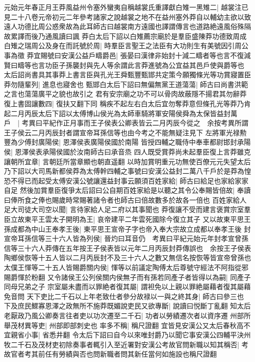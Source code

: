 元始元年春正月王莽風益州令塞外蠻夷自稱越裳氏重譯獻白雉一黑雉二|{
	越裳注已見二十八卷元帝初元二年參考諸家之說越裳之地不在益州塞外莽自以輔幼主欲以致遠人功德比周公惑衆故為此耳師古曰越裳南方遠國也譯謂傳言也道路絶遠風俗殊隔故累譯而後乃通風讀曰諷}
莽白太后下詔以白雉薦宗廟於是羣臣盛陳莽功德致周成白雉之瑞周公及身在而託號於周|{
	時羣臣言聖王之法臣有大功則生有美號因引周公事為徵}
莽宜賜號曰安漢公益戶疇爵邑|{
	張晏曰漢律非始封十減二疇者等也言不復減賢曰疇等也言功臣子孫襲封與先人等余謂此言莽進號為公宜益其邑戶使與爵等也}
太后詔尚書具其事莽上書言臣與孔光王舜甄豐甄邯共定策今願獨條光等功賞寢置臣莽勿隨輩列|{
	進息也寢舍也}
甄邯白太后下詔曰無偏無黨王道蕩蕩|{
	師古曰尚書洪範之言也蕩蕩廣平之貌也故引之}
君有安宗廟之功不可以骨肉故蔽隱不揚君其勿辭莽復上書固讓數四|{
	復扶又翻下同}
稱疾不起左右白太后宜勿奪莽意但條孔光等莽乃肯起二月丙辰太后下詔以太傅博山侯光為太師車騎將軍安陽侯舜為太保皆益封萬戶　|{
	考異曰平紀作正月事而王子侯表公卿表皆云二月丙辰今從之　余按考異所謂王子侯云二月丙辰封者謂宣帝耳孫信等也由今考之不能無疑注見下}
左將軍光禄勲豐為少傅封廣陽侯|{
	恩澤侯表廣陽侯國於南陽}
皆授四輔之職侍中奉車都尉邯封承陽侯|{
	恩澤侯表承陽侯國於汝南師古曰承音烝}
四人既受賞莽尚未起羣臣復上言莽雖克讓朝所宜章|{
	言朝廷所當章顯也朝直遥翻}
以時加賞明重元功無使百僚元元失望太后乃下詔以大司馬新都侯莽為太傅幹四輔之事號曰安漢公益封二萬八千戶於是莽為惶恐不得已而起受太傅安漢公號讓還益封事云願須百姓家給|{
	師古曰給足也家給家家自足}
然後加賞羣臣復爭太后詔曰公自期百姓家給是以聽之其令公奉賜皆倍故|{
	奉讀曰俸所食之俸也賜歲時常賜著諸令者也師古曰倍故數多於故各一倍也}
百姓家給人足大司徒大司空以聞|{
	言待家給人足二府以其事聞也}
莽復讓不受而建言褒賞宗室羣臣立故東平王雲太子開明為王|{
	哀帝建平二年雲死國除今復立其子}
又以故東平思王孫成都為中山王奉孝王後|{
	東平思王宣帝子字也帝入奉大宗故立成都以奉孝王後}
封宣帝耳孫信等三十六人皆為列侯|{
	晉灼曰耳音仍　考異曰平紀元始元年封孝宣曾孫信等三十六人莽傳在五年按王子侯表皆以元年二月丙辰封莽傳誤也　余按王子侯表陶鄉侯恢等十五人皆以二月丙辰封不及三十六人之數又無信名按恢等皆宣帝曾孫也}
太僕王惲等二十五人皆賜爵關内侯|{
	惲等以前議定陶傅太后尊號守經法不阿指從邪賜爵惲於粉翻}
又令諸侯王公列侯關内侯無子而有孫若同產子者皆得以為嗣|{
	同產子同母兄弟之子}
宗室屬未盡而以罪絶者復其屬|{
	謂袒免以上親以罪絶屬藉者復其屬藉免音問}
天下吏比二千石以上年老致仕者參分故禄以一與之終其身|{
	師古曰參三也}
下及庶民鰥寡恩澤之政無所不施莽既媚說吏民又欲專斷|{
	說讀曰悦斷丁亂翻}
知太后老厭政乃風公卿奏言往者吏以功次遷至二千石|{
	功者以勞績遷次者以資序遷}
州部所舉茂材異等吏|{
	州部即部刺史也}
率多不稱|{
	稱尺證翻}
宜皆見安漢公又太后春秋高不宜親省小事|{
	省悉井翻}
令太后下詔曰自今以來唯封爵乃以聞它事安漢公四輔平決州牧二千石及茂材吏初除奏事者輒引入至近署對安漢公考故官問新職以知其稱否|{
	考故官者考其前任有勞績與否也問新職者問其新任當何如施設也稱尺證翻}
